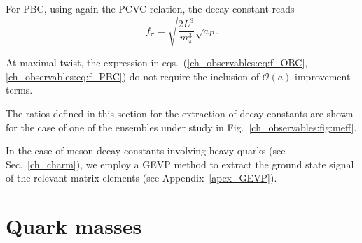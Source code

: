 For PBC, using again the PCVC relation, the decay constant reads
\begin{equation}
\label{ch_observables:eq:f_PBC}
f_{\pi}=\sqrt{\frac{2L^3}{m_{\pi}^3}}\sqrt{a_P}.
\end{equation}

At maximal twist, the expression in eqs.~(\ref{ch_observables:eq:f_OBC},\ref{ch_observables:eq:f_PBC}) do not require the inclusion of $\mathcal{O}(a)$ improvement terms.

The ratios defined in this section for the extraction of decay constants are shown for the case of one of the ensembles under study in Fig.~\ref{ch_observables:fig:meff}.

In the case of meson decay constants involving heavy quarks (see Sec.~\ref{ch_charm}), we employ a GEVP method to extract the ground state signal of the relevant matrix elements (see Appendix~\ref{apex_GEVP}).


\section{Quark masses}
\label{ch_observables:sec:quark_mass}

